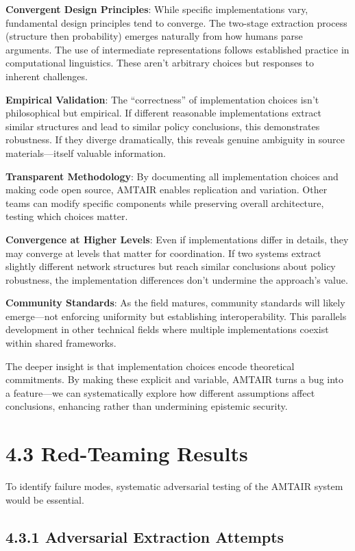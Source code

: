 \documentclass[
  11pt,
  letterpaper,
  openany]{book}
\begin{document}
\textbf{Convergent Design Principles}: While specific implementations
vary, fundamental design principles tend to converge. The two-stage
extraction process (structure then probability) emerges naturally from
how humans parse arguments. The use of intermediate representations
follows established practice in computational linguistics. These aren't
arbitrary choices but responses to inherent challenges.

\textbf{Empirical Validation}: The ``correctness'' of implementation
choices isn't philosophical but empirical. If different reasonable
implementations extract similar structures and lead to similar policy
conclusions, this demonstrates robustness. If they diverge dramatically,
this reveals genuine ambiguity in source materials---itself valuable
information.

\textbf{Transparent Methodology}: By documenting all implementation
choices and making code open source, AMTAIR enables replication and
variation. Other teams can modify specific components while preserving
overall architecture, testing which choices matter.

\textbf{Convergence at Higher Levels}: Even if implementations differ in
details, they may converge at levels that matter for coordination. If
two systems extract slightly different network structures but reach
similar conclusions about policy robustness, the implementation
differences don't undermine the approach's value.

\textbf{Community Standards}: As the field matures, community standards
will likely emerge---not enforcing uniformity but establishing
interoperability. This parallels development in other technical fields
where multiple implementations coexist within shared frameworks.

The deeper insight is that implementation choices encode theoretical
commitments. By making these explicit and variable, AMTAIR turns a bug
into a feature---we can systematically explore how different assumptions
affect conclusions, enhancing rather than undermining epistemic
security.

\section{4.3 Red-Teaming Results}\label{sec-red-teaming}

To identify failure modes, systematic adversarial testing of the AMTAIR
system would be essential.

\subsection{4.3.1 Adversarial Extraction
Attempts}\label{sec-adversarial-extraction}
\end{document}
